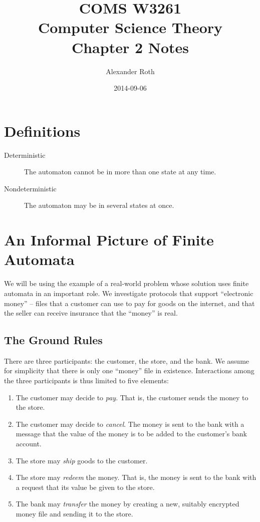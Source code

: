 \documentclass[]{article}
\begin{document}
\title{COMS W3261 \\ Computer Science Theory \\ Chapter 2 Notes}
\author{Alexander Roth}
\date{2014-09-06}
\maketitle

\section*{Definitions}
  \begin{description}
    \item[Deterministic] The automaton cannot be in more than one state at any 
    time.
    \item[Nondeterministic] The automaton may be in several states at once.
  \end{description}

\section*{An Informal Picture of Finite Automata}
  We will be using the example of a real-world problem whose solution uses 
  finite automata in an important role. We investigate protocols that support 
  ``electronic money'' -- files that a customer can use to pay for goods on 
  the internet, and that the seller can receive insurance that the ``money'' 
  is real.
  
  \subsection*{The Ground Rules}
    There are three participants: the customer, the store, and the bank. We 
    assume for simplicity that there is only one ``money'' file in existence.
    Interactions among the three participants is thus limited to five 
    elements:
    \begin{enumerate}
      \item The customer may decide to \emph{pay}. That is, the customer sends
      the money to the store.
      \item The customer may decide to \emph{cancel}. The money is sent to the
      bank with a message that the value of the money is to be added to the
      customer's bank account.
      \item The store may \emph{ship} goods to the customer.
      \item The store may \emph{redeem} the money. That is, the money is sent
      to the bank with a request that its value be given to the store.
      \item The bank may \emph{transfer} the money by creating a new, suitably
      encrypted money file and sending it to the store.
    \end{enumerate}
    
\end{document}
